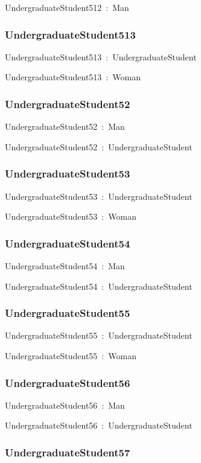 \documentclass{article}
\begin{document}
UndergraduateStudent512~:~Man

\subsubsection*{UndergraduateStudent513}

UndergraduateStudent513~:~UndergraduateStudent

UndergraduateStudent513~:~Woman

\subsubsection*{UndergraduateStudent52}

UndergraduateStudent52~:~Man

UndergraduateStudent52~:~UndergraduateStudent

\subsubsection*{UndergraduateStudent53}

UndergraduateStudent53~:~UndergraduateStudent

UndergraduateStudent53~:~Woman

\subsubsection*{UndergraduateStudent54}

UndergraduateStudent54~:~Man

UndergraduateStudent54~:~UndergraduateStudent

\subsubsection*{UndergraduateStudent55}

UndergraduateStudent55~:~UndergraduateStudent

UndergraduateStudent55~:~Woman

\subsubsection*{UndergraduateStudent56}

UndergraduateStudent56~:~Man

UndergraduateStudent56~:~UndergraduateStudent

\subsubsection*{UndergraduateStudent57}
\end{document}
